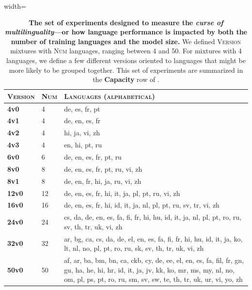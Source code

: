 \begin{table}
\small
\setlength{\tabcolsep}{3pt}
\caption{\textbf{The set of experiments designed to measure the \emph{curse of multilinguality}---or how language performance is impacted by both the number of training languages and the model size.} 
We defined \textsc{Version} mixtures with \textsc{Num} languages, ranging between 4 and 50. For mixtures with 4 languages, we define a few different versions oriented to languages that might be more likely to be grouped together.
This set of experiments are summarized in the \textbf{Capacity} row of .}
\begin{adjustbox}{width=\textwidth}
\begin{tabular}{ll p{12cm}}
\toprule
\textsc{Version} & \textsc{Num} & \textsc{Languages (alphabetical)} \\
\midrule
\textbf{4v0}  & 4  & de, es, fr, pt \\
\textbf{4v1}  & 4  & de, en, es, fr \\
\textbf{4v2}  & 4  & hi, ja, vi, zh \\
\textbf{4v3}  & 4  & en, hi, pt, ru \\
\textbf{6v0}  & 6  & de, en, es, fr, pt, ru \\
\textbf{8v0}  & 8  & de, en, es, fr, pt, ru, vi, zh \\
\textbf{8v1}  & 8  & de, en, fr, hi, ja, ru, vi, zh \\
\textbf{12v0} & 12 & de, en, es, fr, hi, it, ja, pl, pt, ru, vi, zh \\
\textbf{16v0} & 16 & de, en, es, fr, hi, id, it, ja, nl, pl, pt, ru, sv, tr, vi, zh \\
\textbf{24v0} & 24 & cs, da, de, en, es, fa, fi, fr, hi, hu, id, it, ja, nl, pl, pt, ro, ru, sv, th, tr, uk, vi, zh \\
\textbf{32v0} & 32 & ar, bg, ca, cs, da, de, el, en, es, fa, fi, fr, hi, hu, id, it, ja, ko, lt, nl, no, pl, pt, ro, ru, sk, sv, th, tr, uk, vi, zh \\
\textbf{50v0} & 50 & af, ar, ba, bm, bn, ca, ckb, cy, de, ee, el, en, es, fa, fil, fr, gn, gu, ha, he, hi, hr, id, it, ja, jv, kk, ko, mr, ms, my, nl, no, om, pl, ps, pt, ro, ru, sm, sv, sw, te, th, tr, uk, ur, vi, yo, zh \\
\bottomrule
\end{tabular}
\end{adjustbox}

\label{tab:capacity-exps}
\end{table}

